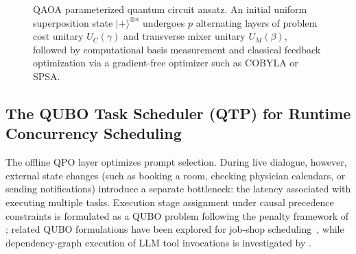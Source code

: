 \documentclass[review,12pt,times,authoryear]{elsarticle}
\theoremstyle{definition}
\begin{document}
\begin{figure}[t]
\caption{QAOA parameterized quantum circuit ansatz. An initial uniform superposition state $|+\rangle^{\otimes n}$ undergoes $p$ alternating layers of problem cost unitary $U_C(\gamma)$ and transverse mixer unitary $U_M(\beta)$, followed by computational basis measurement and classical feedback optimization via a gradient-free optimizer such as COBYLA or SPSA.}
\label{fig:qaoa_convergence}
\end{figure}

\subsection{The QUBO Task Scheduler (QTP) for Runtime Concurrency Scheduling}
\label{sec:qtp_formulation}
The offline QPO layer optimizes prompt selection. During live dialogue, however, external state changes (such as booking a room, checking physician calendars, or sending notifications) introduce a separate bottleneck: the latency associated with executing multiple tasks. Execution stage assignment under causal precedence constraints is formulated as a QUBO problem following the penalty framework of \citet{Glover2019}; related QUBO formulations have been explored for job-shop scheduling~\citep{Geitz2022,Aggoune2023}, while dependency-graph execution of LLM tool invocations is investigated by \citet{Kim2024}. 
\end{document}

